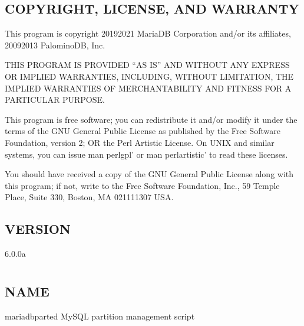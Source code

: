 \documentclass[letterpaper,10pt,english]{sphinxmanual}
\begin{document}
\section{COPYRIGHT, LICENSE, AND WARRANTY}
\label{\detokenize{mariadb-parted:copyright-license-and-warranty}}
This program is copyright 2019\sphinxhyphen{}2021 MariaDB Corporation and/or its affiliates,
2009\sphinxhyphen{}2013 PalominoDB, Inc.

THIS PROGRAM IS PROVIDED “AS IS” AND WITHOUT ANY EXPRESS OR IMPLIED
WARRANTIES, INCLUDING, WITHOUT LIMITATION, THE IMPLIED WARRANTIES OF
MERCHANTABILITY AND FITNESS FOR A PARTICULAR PURPOSE.

This program is free software; you can redistribute it and/or modify it under
the terms of the GNU General Public License as published by the Free Software
Foundation, version 2; OR the Perl Artistic License.  On UNIX and similar
systems, you can issue \textasciigrave{}man perlgpl’ or \textasciigrave{}man perlartistic’ to read these
licenses.

You should have received a copy of the GNU General Public License along with
this program; if not, write to the Free Software Foundation, Inc., 59 Temple
Place, Suite 330, Boston, MA  02111\sphinxhyphen{}1307  USA.


\section{VERSION}
\label{\detokenize{mariadb-parted:version}}
 6.0.0a


\chapter{}
\label{\detokenize{mariadb-parted-fat:mariadb-parted-fat}}\label{\detokenize{mariadb-parted-fat::doc}}

\section{NAME}
\label{\detokenize{mariadb-parted-fat:name}}
mariadb\sphinxhyphen{}parted \sphinxhyphen{} MySQL partition management script
\end{document}
